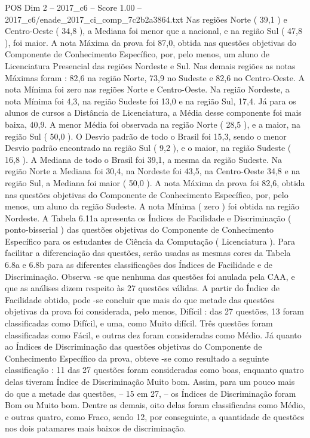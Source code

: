 \begin{textsample}{POS Dim 2 – 2017\_c6 – Score 1.00 – 2017\_c6/enade\_2017\_ci\_comp\_7c2b2a3864.txt}
Nas regiões Norte ( 39,1 ) e Centro-Oeste ( 34,8 ), a Mediana foi menor que a nacional, e na região Sul ( 47,8 ), foi maior.
A nota Máxima da prova foi 87,0, obtida nas questões objetivas do Componente de Conhecimento Específico, por, pelo menos, um aluno de Licenciatura Presencial das regiões Nordeste e Sul.
Nas demais regiões as notas Máximas foram : 82,6 na região Norte, 73,9 no Sudeste e 82,6 no Centro-Oeste.
A nota Mínima foi zero nas regiões Norte e Centro-Oeste.
Na região Nordeste, a nota Mínima foi 4,3, na região Sudeste foi 13,0 e na região Sul, 17,4.
Já para os alunos de cursos a Distância de Licenciatura, a Média desse componente foi mais baixa, 40,9.
A menor Média foi observada na região Norte ( 28,5 ), e a maior, na região Sul ( 50,0 ).
O Desvio padrão de todo o Brasil foi 15,3, sendo o menor Desvio padrão encontrado na região Sul ( 9,2 ), e o maior, na região Sudeste ( 16,8 ).
A Mediana de todo o Brasil foi 39,1, a mesma da região Sudeste.
Na região Norte a Mediana foi 30,4, na Nordeste foi 43,5, na Centro-Oeste 34,8 e na região Sul, a Mediana foi maior ( 50,0 ).
A nota Máxima da prova foi 82,6, obtida nas questões objetivas do Componente de Conhecimento Específico, por, pelo menos, um aluno da região Sudeste.
A nota Mínima ( zero ) foi obtida na região Nordeste.
A Tabela 6.11a apresenta os Índices de Facilidade e Discriminação ( ponto-bisserial ) das questões objetivas do Componente de Conhecimento Específico para os estudantes de Ciência da Computação ( Licenciatura ).
Para facilitar a diferenciação das questões, serão usadas as mesmas cores da Tabela 6.8a e 6.8b para as diferentes classificações dos Índices de Facilidade e de Discriminação.
Observa -se que nenhuma das questões foi anulada pela CAA, e que as análises dizem respeito às 27 questões válidas.
A partir do Índice de Facilidade obtido, pode -se concluir que mais do que metade das questões objetivas da prova foi considerada, pelo menos, Difícil : das 27 questões, 13 foram classificadas como Difícil, e uma, como Muito difícil.
Três questões foram classificadas como Fácil, e outras dez foram consideradas como Médio.
Já quanto ao Índices de Discriminação das questões objetivas do Componente de Conhecimento Específico da prova, obteve -se como resultado a seguinte classificação : 11 das 27 questões foram consideradas como boas, enquanto quatro delas tiveram Índice de Discriminação Muito bom.
Assim, para um pouco mais do que a metade das questões, – 15 em 27, – os Índices de Discriminação foram Bom ou Muito bom.
Dentre as demais, oito delas foram classificadas como Médio, e outras quatro, como Fraco, sendo 12, por conseguinte, a quantidade de questões nos dois patamares mais baixos de discriminação.

\end{textsample}
